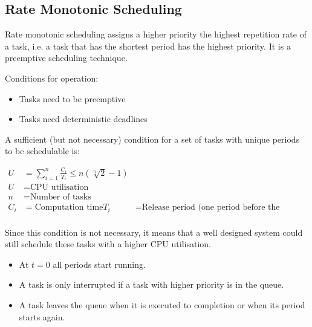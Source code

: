 	\subsection{Rate Monotonic Scheduling}
		Rate monotonic scheduling assigns a higher priority the highest repetition rate of a task, i.e. a task that has the shortest period has the highest priority. It is a preemptive scheduling technique.
		
		Conditions for operation:
		\begin{itemize}
		  \item Tasks need to be preemptive
		  \item Tasks need deterministic deadlines
		\end{itemize}
		
		A sufficient (but not necessary) condition for a set of tasks with unique periods to be schedulable is:
		
		\begin{equation*}
			\begin{aligned}
				U &= \sum_{i=1}^{n} \frac{C_i}{T_i} \leq n(\sqrt[n]{2}-1)\\
				U &= \text{CPU utilisation}\\
				n &= \text{Number of tasks}\\
				C_{i} &= \text{Computation time}
				T_{i} &= \text{Release period (one period before the deadline)}\\
			\end{aligned}
		\end{equation*}
		
		Since this condition is not necessary, it means that a well designed system could still schedule these tasks with a higher CPU utilisation.
		
		\begin{itemize}
		  \item At $t = 0$ all periods start running.
		  \item A task is only interrupted if a task with higher priority is in the queue.
		  \item A task leaves the queue when it is executed to completion or when its period starts again.
		\end{itemize}

